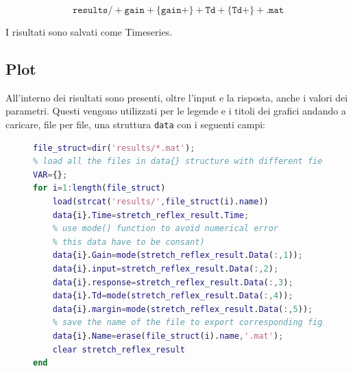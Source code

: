 \begin{equation*}
	\mathtt{results/}+\mathtt{gain}+\{\mathtt{gain}+\}+\mathtt{Td}+\{\mathtt{Td}+\}+\mathtt{.mat}
\end{equation*}

I risultati sono salvati come Timeseries.

\subsection{Plot}

All'interno dei risultati sono presenti, oltre l'input e la risposta, anche i valori dei parametri. Questi vengono utilizzati per le legende e i titoli dei grafici andando a caricare, file per file, una struttura \texttt{data{}} con i seguenti campi:

\begin{figure}[h!]
\begin{lstlisting}[language=matlab,style=mystyle]
file_struct=dir('results/*.mat');
% load all the files in data{} structure with different fields
VAR={};
for i=1:length(file_struct)
	load(strcat('results/',file_struct(i).name))
	data{i}.Time=stretch_reflex_result.Time;
	% use mode() function to avoid numerical error
	% this data have to be consant)
	data{i}.Gain=mode(stretch_reflex_result.Data(:,1));
	data{i}.input=stretch_reflex_result.Data(:,2);
	data{i}.response=stretch_reflex_result.Data(:,3);
	data{i}.Td=mode(stretch_reflex_result.Data(:,4));
	data{i}.margin=mode(stretch_reflex_result.Data(:,5));
	% save the name of the file to export corresponding figs
	data{i}.Name=erase(file_struct(i).name,'.mat');
	clear stretch_reflex_result
end
\end{lstlisting}
\end{figure}


